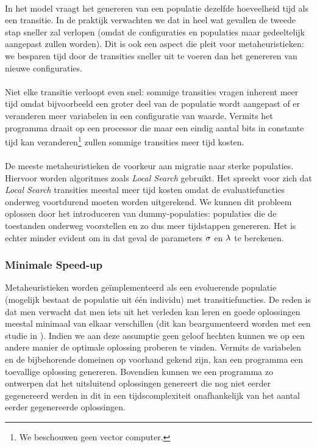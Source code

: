 \paragraph{}
In het model vraagt het genereren van een populatie dezelfde hoeveelheid tijd als een transitie. In de praktijk verwachten we dat in heel wat gevallen de tweede stap sneller zal verlopen (omdat de configuraties en populaties maar gedeeltelijk aangepast zullen worden). Dit is ook een aspect die pleit voor metaheuristieken: we besparen tijd door de transities sneller uit te voeren dan het genereren van nieuwe configuraties.

\paragraph{}
Niet elke transitie verloopt even snel: sommige transities vragen inherent meer tijd omdat bijvoorbeeld een groter deel van de populatie wordt aangepast of er veranderen meer variabelen in een configuratie van waarde. Vermits het programma draait op een processor die maar een eindig aantal bits in constante tijd kan veranderen\footnote{We beschouwen geen vector computer.} zullen sommige transities meer tijd kosten.

\paragraph{}
De meeste metaheuristieken de voorkeur aan migratie naar sterke populaties. Hiervoor worden algoritmes zoals \emph{Local Search} gebruikt. Het spreekt voor zich dat \emph{Local Search} transities meestal meer tijd kosten omdat de evaluatiefuncties onderweg voortdurend moeten worden uitgerekend. We kunnen dit probleem oplossen door het introduceren van dummy-populaties: populaties die de toestanden onderweg voorstellen en zo dus meer tijdstappen genereren. Het is echter minder evident om in dat geval de parameters $\sigma$ en $\lambda$ te berekenen.

\subsubsection{Minimale Speed-up}

Metaheuristieken worden ge\"implementeerd als een evoluerende populatie (mogelijk bestaat de populatie uit \'e\'en individu) met transitiefuncties. De reden is dat men verwacht dat men iets uit het verleden kan leren en goede oplossingen meestal minimaal van elkaar verschillen (dit kan beargumenteerd worden met een studie in \cite{kirkPatrick}). Indien we aan deze assumptie geen geloof hechten kunnen we op een andere manier de optimale oplossing proberen te vinden. Vermits de variabelen en de bijbehorende domeinen op voorhand gekend zijn, kan een programma een toevallige oplossing genereren. Bovendien kunnen we een programma zo ontwerpen dat het uitsluitend oplossingen genereert die nog niet eerder gegenereerd werden in dit in een tijdscomplexiteit onafhankelijk van het aantal eerder gegenereerde oplossingen.
